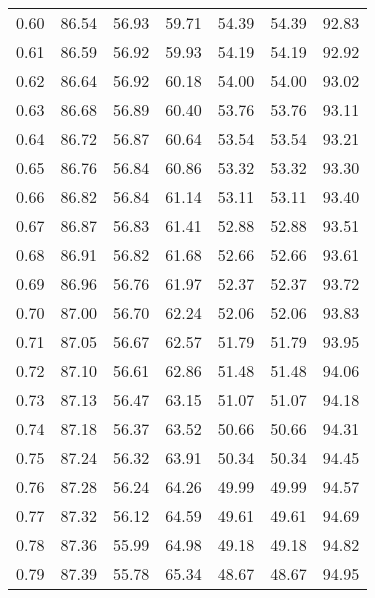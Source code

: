 \begin{tabular}{|c|c|c|c|c|c|c|}
      0.60 &     86.54 &     56.93 &      59.71 &   54.39 &      54.39 &         92.83 \\
      0.61 &     86.59 &     56.92 &      59.93 &   54.19 &      54.19 &         92.92 \\
      0.62 &     86.64 &     56.92 &      60.18 &   54.00 &      54.00 &         93.02 \\
      0.63 &     86.68 &     56.89 &      60.40 &   53.76 &      53.76 &         93.11 \\
      0.64 &     86.72 &     56.87 &      60.64 &   53.54 &      53.54 &         93.21 \\
      0.65 &     86.76 &     56.84 &      60.86 &   53.32 &      53.32 &         93.30 \\
      0.66 &     86.82 &     56.84 &      61.14 &   53.11 &      53.11 &         93.40 \\
      0.67 &     86.87 &     56.83 &      61.41 &   52.88 &      52.88 &         93.51 \\
      0.68 &     86.91 &     56.82 &      61.68 &   52.66 &      52.66 &         93.61 \\
      0.69 &     86.96 &     56.76 &      61.97 &   52.37 &      52.37 &         93.72 \\
      0.70 &     87.00 &     56.70 &      62.24 &   52.06 &      52.06 &         93.83 \\
      0.71 &     87.05 &     56.67 &      62.57 &   51.79 &      51.79 &         93.95 \\
      0.72 &     87.10 &     56.61 &      62.86 &   51.48 &      51.48 &         94.06 \\
      0.73 &     87.13 &     56.47 &      63.15 &   51.07 &      51.07 &         94.18 \\
      0.74 &     87.18 &     56.37 &      63.52 &   50.66 &      50.66 &         94.31 \\
      0.75 &     87.24 &     56.32 &      63.91 &   50.34 &      50.34 &         94.45 \\
      0.76 &     87.28 &     56.24 &      64.26 &   49.99 &      49.99 &         94.57 \\
      0.77 &     87.32 &     56.12 &      64.59 &   49.61 &      49.61 &         94.69 \\
      0.78 &     87.36 &     55.99 &      64.98 &   49.18 &      49.18 &         94.82 \\
      0.79 &     87.39 &     55.78 &      65.34 &   48.67 &      48.67 &         94.95 \\

\end{tabular}
